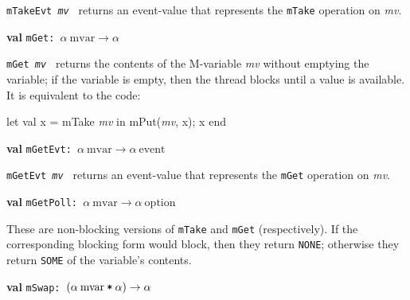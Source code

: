 \begin{descr}
\begin{speccomment}
\item {\tt m\-Take\-Evt \textit{mv}           } 
returns an event-value that represents the \texttt{m\-Take} 	  operation on \textit{mv}.\-     \end{speccomment}
\item {}{\textbf{val}} {\tt mGet: \(\alpha\:\mathrm{mvar}\rightarrow \alpha\)}\label{val-SYNC_VAR.mGet}


\begin{speccomment}
\item {\tt m\-Get \textit{mv}           } 
returns the contents of the M-variable \textit{mv} without emptying 	  the variable; if the variable is empty, then the thread blocks until 	  a value is available.\- 	  It is equivalent to the code: 	  
\begin{code}
let val x = mTake \textit{mv} in mPut(\textit{mv}, x); x end
	  
\end{code}
     \end{speccomment}
\item {}{\textbf{val}} {\tt mGetEvt: \(\alpha\:\mathrm{mvar}\rightarrow \alpha\:\mathrm{event}\)}\label{val-SYNC_VAR.mGetEvt}


\begin{speccomment}
\item {\tt m\-Get\-Evt \textit{mv}           } 
returns an event-value that represents the \texttt{m\-Get} 	  operation on \textit{mv}.\-     \end{speccomment}
\item {}{\textbf{val}} {\tt mGetPoll: \(\alpha\:\mathrm{mvar}\rightarrow \alpha\:\mathrm{option}\)}\label{val-SYNC_VAR.mGetPoll}


\begin{speccomment}
\item 

	  These are non-blocking versions of \texttt{m\-Take} and 	  \texttt{m\-Get} (respectively).\- 	  If the corresponding blocking form would block, then they return 	  \texttt{NONE}; otherwise 	  they return \texttt{SOME} 	  of the variable's contents.\-     \end{speccomment}
\item {}{\textbf{val}} {\tt mSwap: \((\alpha\:\mathrm{mvar}\:\verb,*,\:\alpha)\rightarrow \alpha\)}\label{val-SYNC_VAR.mSwap}



\end{descr}
